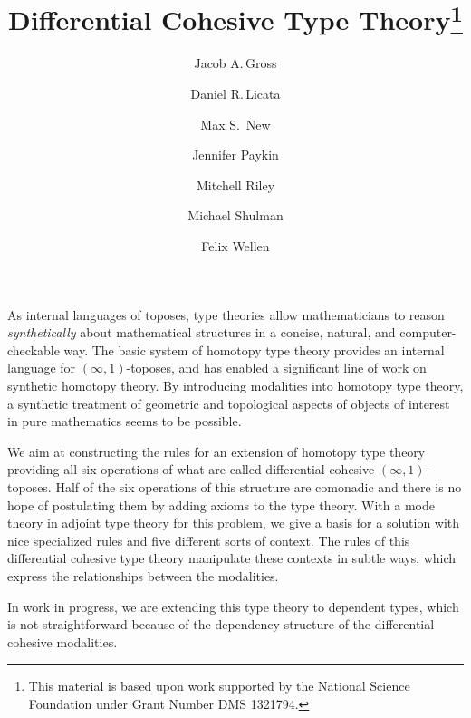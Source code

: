 \documentclass{article}
\title{Differential Cohesive Type Theory\thanks{This
    material is based upon work supported by the National Science Foundation
    under Grant Number DMS 1321794.}}
\author{Jacob A.\,Gross}
\affil[1]{University of Pittsburgh}
\author[2]{Daniel R.\,Licata}
\affil[2]{Wesleyan University}
\author[3]{Max S.\, New}
\affil[3]{Northeastern University}
\author[4]{Jennifer Paykin}
\affil[4]{University of Pennsylvania}
\author[2]{Mitchell Riley}
\author[5]{Michael Shulman}
\affil[5]{University of San Diego}
\author[6]{Felix Wellen}
\affil[6]{Karlsruhe Institute of Technology}
\date{}
\begin{document}
\maketitle

As internal languages of toposes, type theories allow mathematicians to
reason \emph{synthetically} about mathematical structures in a concise,
natural, and computer-checkable way.  
The basic system of homotopy type theory provides an internal language for
$(\infty,1)$-toposes, and has enabled a significant line of work on
synthetic homotopy theory. 
By introducing modalities into homotopy type theory,
a synthetic treatment of geometric and topological aspects 
of objects of interest in pure mathematics seems to be possible. 

We aim at constructing the rules for an extension of homotopy type theory
providing all six operations of what are called differential cohesive $(\infty,1)$-toposes.
Half of the six operations of this structure are comonadic and there is no hope of 
postulating them by adding axioms to the type theory.
With a mode theory in adjoint type theory for this problem, 
we give a basis for a solution with nice specialized rules
and five different sorts of context.
The rules of this differential
cohesive type theory manipulate these contexts in subtle ways, which express
the relationships between the modalities.

In work in progress, we are extending this type theory to dependent types, which
is not straightforward because of the dependency structure of the differential
cohesive modalities. 
\end{document}
